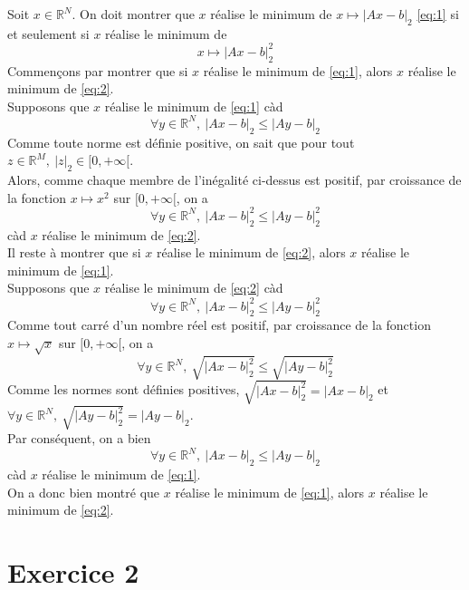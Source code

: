 \documentclass[a4paper, 10pt]{article}
\newcommand{\IR}{\mathbb{R}}
\begin{document}
Soit \( x \in \IR^N \). On doit montrer que \( x \) réalise le minimum de \( x \mapsto |Ax - b|_2 \) \eqref{eq:1} si et seulement si \( x \) réalise le minimum de
\begin{equation}
    \label{eq:2}
    x \mapsto |Ax - b|_2^2
\end{equation}
Commençons par montrer que si \( x \) réalise le minimum de \eqref{eq:1}, alors \( x \) réalise le minimum de \eqref{eq:2}. \\
Supposons que \( x \) réalise le minimum de \eqref{eq:1} càd
$$
\forall y \in \IR^N,~ |Ax - b|_2 \leq |Ay - b|_2
$$
Comme toute norme est définie positive, on sait que pour tout \( z \in \IR^M,~ |z|_2 \in [0, +\infty[ \). \\
Alors, comme chaque membre de l'inégalité ci-dessus est positif, par croissance de la fonction \( x \mapsto x^2 \) sur \( [0, +\infty[ \), on a
$$
\forall y \in \IR^N,~ |Ax - b|_2^2 \leq |Ay - b|_2^2
$$
càd \( x \) réalise le minimum de \eqref{eq:2}. \\
Il reste à montrer que si \( x \) réalise le minimum de \eqref{eq:2}, alors \( x \) réalise le minimum de \eqref{eq:1}. \\
Supposons que \( x \) réalise le minimum de \eqref{eq:2} càd
$$
\forall y \in \IR^N,~ |Ax - b|_2^2 \leq |Ay - b|_2^2
$$
Comme tout carré d'un nombre réel est positif, par croissance de la fonction \( x \mapsto \sqrt{x} \) sur \( [0, +\infty[ \), on a
$$
\forall y \in \IR^N,~ \sqrt{|Ax - b|_2^2} \leq \sqrt{|Ay - b|_2^2}
$$
Comme les normes sont définies positives, \( \sqrt{|Ax - b|_2^2} = |Ax - b|_2 \) et \( \forall y \in \IR^N,~ \sqrt{|Ay - b|_2^2} = |Ay - b|_2 \). \\
Par conséquent, on a bien
$$
\forall y \in \IR^N,~ |Ax - b|_2 \leq |Ay - b|_2
$$
càd \( x \) réalise le minimum de \eqref{eq:1}. \\
On a donc bien montré que \( x \) réalise le minimum de \eqref{eq:1}, alors \( x \) réalise le minimum de \eqref{eq:2}.

\newpage

\section{Exercice 2}
\end{document}
